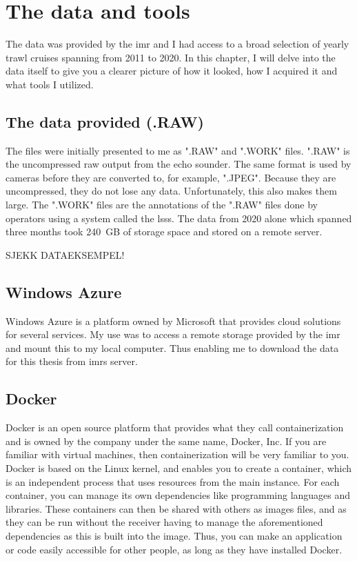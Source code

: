 \section{The data and tools}
    The data was provided by the \gls{imr} and I had access to a broad selection of yearly trawl cruises spanning from 2011 to 2020. In this chapter, I will delve into the data itself to give you a clearer picture of how it looked, how I acquired it and what tools I utilized.
    
    \subsection{The data provided (.RAW)}
        The files were initially presented to me as ".RAW" \cite{raw} and ".WORK" files. ".RAW" is the uncompressed raw output from the echo sounder. The same format is used by cameras before they are converted to, for example, ".JPEG". Because they are uncompressed, they do not lose any data. Unfortunately, this also makes them large. The ".WORK" files are the annotations of the ".RAW" files done by operators using a system called the \Gls{lsss}\cite{lsss}. The data from 2020 alone which spanned three months took 240 GB of storage space and stored on a remote server.
        
        SJEKK DATAEKSEMPEL!
    \subsection{Windows Azure}
        Windows Azure \cite{azure} is a platform owned by Microsoft that provides cloud solutions for several services. My use was to access a remote storage provided by the \gls{imr} and mount this to my local computer. Thus enabling me to download the data for this thesis from \gls{imr}s server. 
    
    \subsection{Docker}
        Docker \cite{docker} is an open source platform that provides what they call containerization and is owned by the company under the same name, Docker, Inc. If you are familiar with virtual machines, then containerization will be very familiar to you. Docker is based on the Linux kernel, and enables you to create a container, which is an independent process that uses resources from the main instance. For each container, you can manage its own dependencies like programming languages and libraries. These containers can then be shared with others as images files, and as they can be run without the receiver having to manage the aforementioned dependencies as this is built into the image. Thus, you can make an application or code easily accessible for other people, as long as they have installed Docker.
        
